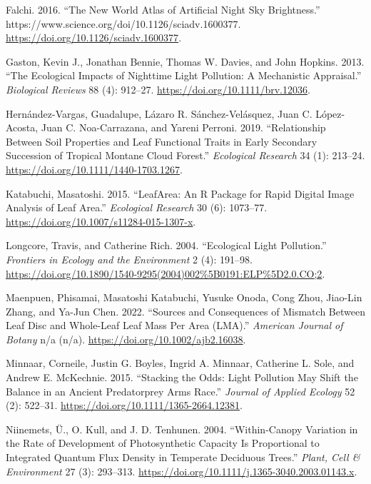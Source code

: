 \documentclass[
  letterpaper,
  DIV=11,
  numbers=noendperiod]{scrartcl}
\newlength{\cslhangindent}
\newlength{\cslentryspacingunit} %
\newenvironment{CSLReferences}[2] %
 {%
  \setlength{\parindent}{0pt}
  \ifodd #1
  \let\oldpar\par
  \def\par{\hangindent=\cslhangindent\oldpar}
  \fi
  \setlength{\parskip}{#2\cslentryspacingunit}
 }%
 {}
\begin{document}
\begin{CSLReferences}{1}{0}
\leavevmode{}%
Falchi. 2016. {``The New World Atlas of Artificial Night Sky
Brightness.''} https://www.science.org/doi/10.1126/sciadv.1600377.
\url{https://doi.org/10.1126/sciadv.1600377}.

\leavevmode{}%
Gaston, Kevin J., Jonathan Bennie, Thomas W. Davies, and John Hopkins.
2013. {``The Ecological Impacts of Nighttime Light Pollution: A
Mechanistic Appraisal.''} \emph{Biological Reviews} 88 (4): 912--27.
\url{https://doi.org/10.1111/brv.12036}.

\leavevmode{}%
Hernández-Vargas, Guadalupe, Lázaro R. Sánchez-Velásquez, Juan C.
López-Acosta, Juan C. Noa-Carrazana, and Yareni Perroni. 2019.
{``Relationship Between Soil Properties and Leaf Functional Traits in
Early Secondary Succession of Tropical Montane Cloud Forest.''}
\emph{Ecological Research} 34 (1): 213--24.
\url{https://doi.org/10.1111/1440-1703.1267}.

\leavevmode{}%
Katabuchi, Masatoshi. 2015. {``{LeafArea}: An {R} Package for Rapid
Digital Image Analysis of Leaf Area.''} \emph{Ecological Research} 30
(6): 1073--77. \url{https://doi.org/10.1007/s11284-015-1307-x}.

\leavevmode{}%
Longcore, Travis, and Catherine Rich. 2004. {``Ecological Light
Pollution.''} \emph{Frontiers in Ecology and the Environment} 2 (4):
191--98.
\url{https://doi.org/10.1890/1540-9295(2004)002\%5B0191:ELP\%5D2.0.CO;2}.

\leavevmode{}%
Maenpuen, Phisamai, Masatoshi Katabuchi, Yusuke Onoda, Cong Zhou,
Jiao-Lin Zhang, and Ya-Jun Chen. 2022. {``Sources and Consequences of
Mismatch Between Leaf Disc and Whole-Leaf Leaf Mass Per Area ({LMA}).''}
\emph{American Journal of Botany} n/a (n/a).
\url{https://doi.org/10.1002/ajb2.16038}.

\leavevmode{}%
Minnaar, Corneile, Justin G. Boyles, Ingrid A. Minnaar, Catherine L.
Sole, and Andrew E. McKechnie. 2015. {``Stacking the Odds: Light
Pollution May Shift the Balance in an Ancient Predator\textendash prey
Arms Race.''} \emph{Journal of Applied Ecology} 52 (2): 522--31.
\url{https://doi.org/10.1111/1365-2664.12381}.

\leavevmode{}%
Niinemets, Ü., O. Kull, and J. D. Tenhunen. 2004. {``Within-Canopy
Variation in the Rate of Development of Photosynthetic Capacity Is
Proportional to Integrated Quantum Flux Density in Temperate Deciduous
Trees.''} \emph{Plant, Cell \& Environment} 27 (3): 293--313.
\url{https://doi.org/10.1111/j.1365-3040.2003.01143.x}.


\end{CSLReferences}
\end{document}
